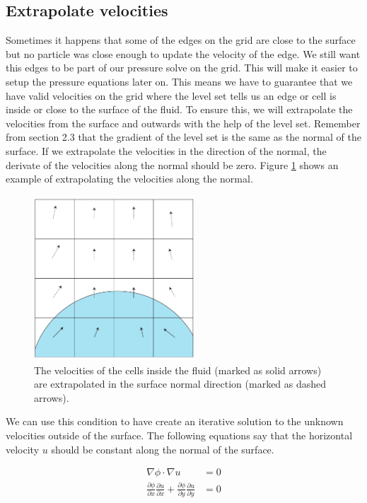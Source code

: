 \subsection{Extrapolate velocities}

Sometimes it happens that some of the edges on the grid are close to the surface but no particle was close enough to update the velocity of the edge. We still want this edges to be part of our pressure solve on the grid. This will make it easier to setup the pressure equations later on. This means we have to guarantee that we have valid velocities on the grid where the level set tells us an edge or cell is inside or close to the surface of the fluid. To ensure this, we will extrapolate the velocities from the surface and outwards with the help of the level set. Remember from section 2.3 that the gradient of the level set is the same as the normal of the surface. If we extrapolate the velocities in the direction of the normal, the derivate of the velocities along the normal should be zero. Figure \ref{extrapic} shows an example of extrapolating the velocities along the normal.

\begin{figure}[ht!]
\centering
\includegraphics[width=60mm]{img/extrapolate.pdf}
\caption{The velocities of the cells inside the fluid (marked as solid arrows) are extrapolated in the surface normal direction (marked as dashed arrows).}
\label{extrapic}
\end{figure}

We can use this condition to have create an iterative solution to the unknown velocities outside of the surface. The following equations say that the horizontal velocity $u$ should be constant along the normal of the surface.

\begin{equation}
\begin{split}
\nabla \phi \cdot \nabla u &= 0 \\
\frac{\partial \phi}{\partial x}\frac{\partial u}{\partial x} + 
\frac{\partial \phi}{\partial y}\frac{\partial u}{\partial y}&= 0
\end{split}
\label{extrapolate}
\end{equation}

